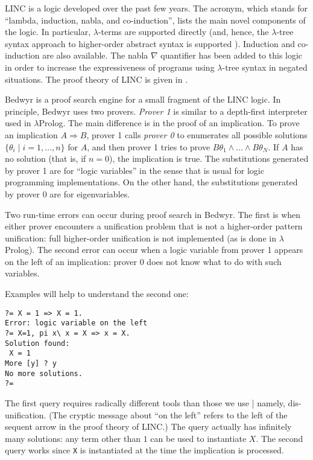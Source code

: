 \documentclass{article}
\begin{document}
LINC is a logic developed over the past few years.  The acronym, which
stands for ``lambda, induction, nabla, and co-induction'', lists the
main novel components of the logic.  In particular, $\lambda$-terms
are supported directly (and, hence, the $\lambda$-tree syntax approach
to higher-order abstract syntax is supported \cite{miller00cl}).
Induction and co-induction are also available.  The nabla $\nabla$
quantifier has been added to this logic in order to increase the
expressiveness of programs using $\lambda$-tree syntax in negated
situations.  The proof theory of LINC is given in
\cite{miller05tocl,tiu04phd}.

Bedwyr is a proof search engine for a small fragment of the LINC
logic.  In principle, Bedwyr uses two provers.  {\em Prover 1} is
similar to a depth-first interpreter used in $\lambda$Prolog.  The
main difference is in the proof of an implication.  To prove an
implication $A\Rightarrow B$, prover 1 calls {\em prover 0} to
enumerates all possible solutions $\{\theta_i\;|\;i=1,\ldots,n\}$ for
$A$, and then prover 1 tries to prove $B\theta_1\wedge\dots\wedge
B\theta_N$.  If $A$ has no solution (that is, if $n=0$), the
implication is true.  The substitutions generated by prover 1 are for
``logic variables'' in the sense that is usual for logic programming
implementations.  On the other hand, the substitutions generated by
prover 0 are for eigenvariables.

Two run-time errors can occur during proof search in Bedwyr.  The first
is when either prover encounters a unification problem that is not a 
higher-order pattern unification: full higher-order unification is not
implemented (as is done in $\lambda$Prolog).  The second error can
occur when a logic variable from prover 1 appears on the left of an
implication: prover 0 does not know what to do with such variables.

Examples will help to understand the second one:
\begin{verbatim}
?= X = 1 => X = 1.
Error: logic variable on the left
?= X=1, pi x\ x = X => x = X.
Solution found:
 X = 1
More [y] ? y
No more solutions.
?= 
\end{verbatim}
The first query requires radically different tools than those we use |
namely, dis-unification. (The cryptic message about ``on the left''
refers to the left of the sequent arrow in the proof theory of LINC.)
The query actually has infinitely many solutions: any term other than
$1$ can be used to instantiate $X$.  The second query works since
\verb.X. is instantiated at the time the implication is processed.
\end{document}
